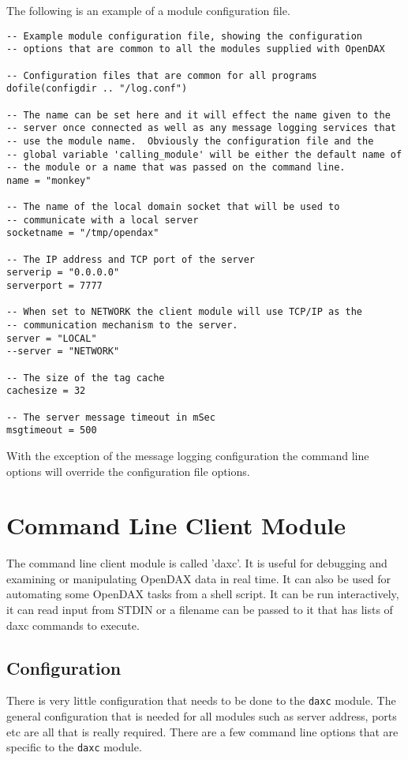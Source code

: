 The following is an example of a module configuration file.

\begin{verbatim}
-- Example module configuration file, showing the configuration
-- options that are common to all the modules supplied with OpenDAX

-- Configuration files that are common for all programs
dofile(configdir .. "/log.conf")

-- The name can be set here and it will effect the name given to the
-- server once connected as well as any message logging services that
-- use the module name.  Obviously the configuration file and the
-- global variable 'calling_module' will be either the default name of
-- the module or a name that was passed on the command line.
name = "monkey"

-- The name of the local domain socket that will be used to
-- communicate with a local server
socketname = "/tmp/opendax"

-- The IP address and TCP port of the server
serverip = "0.0.0.0"
serverport = 7777

-- When set to NETWORK the client module will use TCP/IP as the
-- communication mechanism to the server.
server = "LOCAL"
--server = "NETWORK"

-- The size of the tag cache
cachesize = 32

-- The server message timeout in mSec
msgtimeout = 500
\end{verbatim}

With the exception of the message logging configuration the command line options will override the configuration file options.

\chapter{Command Line Client Module}
The command line client module is called 'daxc'.  It is useful for debugging and examining or manipulating OpenDAX data in real time.  It can also be used for automating some OpenDAX tasks from a shell script.  It can be run interactively, it can read input from STDIN or a filename can be passed to it that has lists of daxc commands to execute.

\section{Configuration}
There is very little configuration that needs to be done to the \texttt{daxc} module.  The general configuration that is needed for all modules such as server address, ports etc are all that is really required.  There are a few command line options that are specific to the \texttt{daxc} module.

